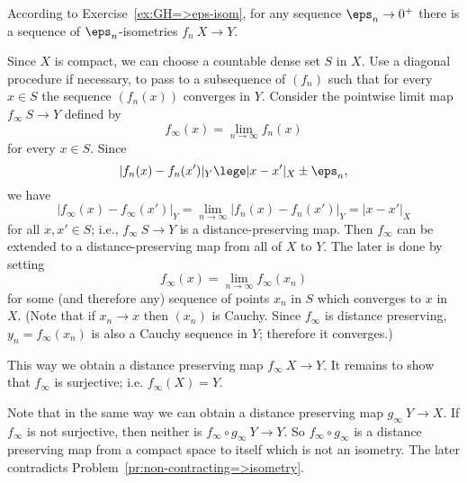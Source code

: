 According to Exercise~\ref{ex:GH=>eps-isom},
for any sequence $\eps_n\to0^+$ there is a sequence of $\eps_n$-isometries 
$f_n\:X\to Y$.

Since $X$ is compact, 
we can choose a countable dense set
$S$ in $X$.
Use a diagonal procedure if necessary, to pass to a subsequence of $(f_n)$
such that for every $x \in S$ the sequence $(f_n(x))$ 
converges in $Y$. 
Consider the pointwise limit map  $f_\infty \: S \to Y$ defined by
 $$f_\infty(x) = \lim_{n\to\infty} f_n (x)$$ for every $x \in S$. 
Since $$|f_n (x)- f_n (x')|_Y\lege |x- x'|_X \pm\eps_n,$$ 
we have 
$$|f_\infty(x)-f_\infty (x')|_Y 
= \lim_{n\to\infty} |f_n(x)-f_n (x')|_Y 
= |x -x'|_X$$ for all
$x, x' \in S$; 
i.e., $f_\infty\:S\to Y$ is a distance-preserving map. 
Then $f_\infty$ can be extended to a distance-preserving map from all of $X$ to $Y$.
The later is done by setting 
$$f_\infty(x)=\lim_{n\to\infty} f_\infty(x_n)$$ 
for some (and therefore any) sequence of points $x_n$ in $S$
which converges to $x$ in $X$.
(Note that if $x_n\to x$ then $(x_n)$ is Cauchy.
Since $f_\infty$ is distance preserving, $y_n=f_\infty(x_n)$ is also a Cauchy sequence in $Y$;
therefore it converges.)

This way we obtain a distance preserving map $f_\infty\:X\to Y$. 
It remains to show that $f_\infty$ is surjective; i.e. $f_\infty(X)=Y$.

Note that in the same way we can obtain a distance preserving map $g_\infty\:Y\to X$.
If $f_\infty$ is not surjective, then neither is $f_\infty\circ g_\infty\:Y\to Y$.
So $f_\infty \circ g_\infty$ is a distance preserving map from a compact space to itself which is not an isometry.
The later contradicts Problem~\ref{pr:non-contracting=>isometry}. 
\qeds

